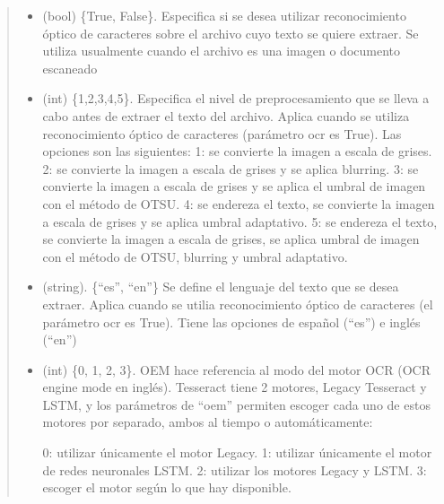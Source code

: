 \documentclass[letterpaper,10pt,openany,spanish]{sphinxmanual}
\begin{document}
\begin{fulllineitems}
\begin{fulllineitems}
\begin{quote}
\begin{description}
\begin{itemize}
\item {} 
 \textendash{} (bool) \{True, False\}. Especifica si se desea utilizar reconocimiento             óptico de caracteres sobre el archivo cuyo texto se quiere extraer. Se utiliza             usualmente cuando el archivo es una imagen o documento escaneado

\item {} 
 \textendash{} (int) \{1,2,3,4,5\}. Especifica el nivel de preprocesamiento             que se lleva a cabo antes de extraer el texto del archivo. Aplica cuando se utiliza             reconocimiento óptico de caracteres (parámetro ocr es True). Las opciones son las siguientes:               
 1: se convierte la imagen a escala de grises.  
 2: se convierte la imagen a escala de grises y se aplica blurring.  
 3: se convierte la imagen a escala de grises y se aplica el umbral de imagen con el                  método de OTSU.  
 4: se endereza el texto, se convierte la imagen a escala de grises y se aplica umbral                 adaptativo.  
 5: se endereza el texto, se convierte la imagen a escala de grises, se aplica umbral                 de imagen con el método de OTSU, blurring y umbral adaptativo.  


\item {} 
 \textendash{} (string). \{“es”, “en”\}  Se define el             lenguaje del texto que se desea extraer. Aplica cuando se utilia reconocimiento             óptico de caracteres (el parámetro ocr es True). Tiene las opciones de español             (“es”) e inglés (“en”)

\item {} 
 \textendash{} (int) \{0, 1, 2, 3\}. OEM hace referencia al modo del motor OCR (OCR engine mode             en inglés). Tesseract tiene 2 motores, Legacy Tesseract y LSTM, y los parámetros de “oem”             permiten escoger cada uno de estos motores por separado, ambos al tiempo o             automáticamente: 
 
 0: utilizar únicamente el motor Legacy.  
 1: utilizar únicamente el motor de redes neuronales LSTM.  
 2: utilizar los motores Legacy y LSTM.  
 3: escoger el motor según lo que hay disponible.  



\end{itemize}
\end{description}
\end{quote}
\end{fulllineitems}
\end{fulllineitems}
\end{document}
